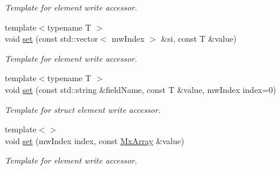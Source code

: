 \begin{DoxyCompactItemize}
\begin{DoxyCompactList}\small\item\em \-Template for element write accessor. \end{DoxyCompactList}\item 
{\footnotesize template$<$typename T $>$ }\\void \hyperlink{class_mx_array_a18aa88f7014b47c3d6b0be8dce9bbd31}{set} (const std\-::vector$<$ mw\-Index $>$ \&si, const \-T \&value)
\begin{DoxyCompactList}\small\item\em \-Template for element write accessor. \end{DoxyCompactList}\item 
{\footnotesize template$<$typename T $>$ }\\void \hyperlink{class_mx_array_ae990e80399f290cf9df59580ad60a491}{set} (const std\-::string \&field\-Name, const \-T \&value, mw\-Index index=0)
\begin{DoxyCompactList}\small\item\em \-Template for struct element write accessor. \end{DoxyCompactList}\item 
{\footnotesize template$<$$>$ }\\void \hyperlink{class_mx_array_acbc4d5b066f9fc7d22361d333bd7b945}{set} (mw\-Index index, const \hyperlink{class_mx_array}{\-Mx\-Array} \&value)
\begin{DoxyCompactList}\small\item\em \-Template for element write accessor. \end{DoxyCompactList}\end{DoxyCompactItemize}

